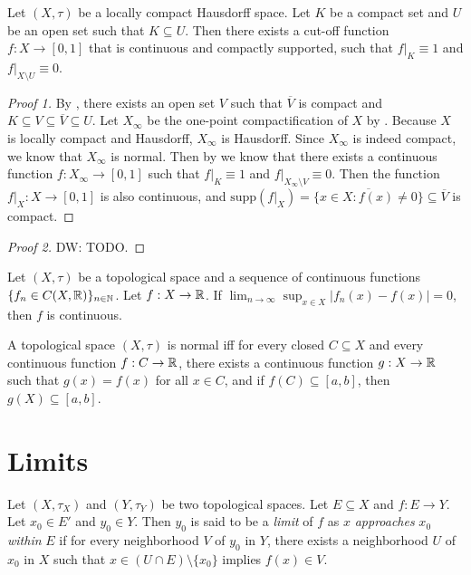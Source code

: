 \documentclass{techreport}
\newcommand{\diw}[1]{{\color{Red} DW: #1}}
\begin{document}
\begin{theorem}\label{The:LocCompT2StrongerCutOff}
	Let $(X,\tau)$ be a locally compact Hausdorff space.
	Let $K$ be a compact set and $U$ be an open set such that $K \subseteq U$.
	Then there exists a cut-off function $f : X \to [0,1]$ that is continuous and compactly supported, such that $f|_K \equiv 1$ and $f|_{X \setminus U} \equiv 0$.
\end{theorem}
\begin{proof}[Proof 1]
	By , there exists an open set $V$ such that $\overline{V}$ is compact and $K \subseteq V \subseteq \overline{V} \subseteq U$.
	Let $X_\infty$ be the one-point compactification of $X$ by .
	Because $X$ is locally compact and Hausdorff, $X_\infty$ is Hausdorff.
	Since $X_\infty$ is indeed compact, we know that $X_\infty$ is normal.
	Then by  we know that there exists a continuous function $f : X_\infty \to [0,1]$ such that $f|_K \equiv 1$ and $f |_{X_\infty \setminus V } \equiv 0$.
	Then the function $f|_X : X \to [0,1]$ is also continuous, and $\mathrm{supp}(f|_X) = \overline{\{x \in X: f(x) \neq 0\}} \subseteq \overline{V}$ is compact.
\end{proof}
\begin{proof}[Proof 2]
	\diw{TODO.}
\end{proof}

\begin{lemma}\label{Lem:UniformContinuous}
	Let $(X,\tau)$ be a topological space and a sequence of continuous functions $\{f_n \in C(X,\mathbb{R})\}_{n \in \mathbb{N}}$.
	Let $f : X \to \mathbb{R}$.
	If $\lim_{n \to \infty} \sup_{x \in X} |f_n(x) - f(x)| = 0$, then $f$ is continuous.
\end{lemma}

\begin{theorem}\label{The:TietzeExtension}
	A topological space $(X,\tau)$ is normal iff for every closed $C \subseteq X$ and every continuous function $f: C \to \mathbb{R}$, there exists a continuous function $g: X \to \mathbb{R}$ such that $g(x) = f(x)$ for all $x \in C$, and if $f(C) \subseteq [a,b]$, then $g(X) \subseteq [a,b]$.
\end{theorem}

\section{Limits}

\begin{definition}\label{De:Limits}
	Let $(X,\tau_X)$ and $(Y,\tau_Y)$ be two topological spaces.
	Let $E \subseteq X$ and $f: E \to Y$.
	Let $x_0 \in E'$ and $y_0 \in Y$.
	Then $y_0$ is said to be a \emph{limit} of $f$ as $x$ \emph{approaches} $x_0$ \emph{within} $E$ if for every neighborhood $V$ of $y_0$ in $Y$, there exists a neighborhood $U$ of $x_0$ in $X$ such that
	$x \in (U \cap E) \setminus \{x_0\}$ implies $f(x) \in V$.
\end{definition}
\end{document}
